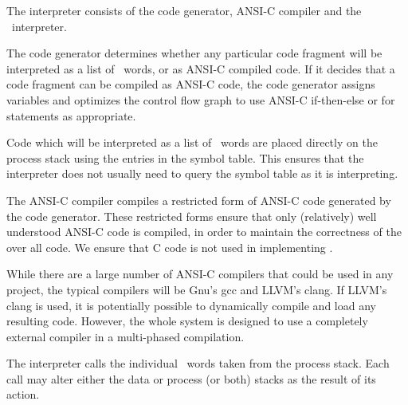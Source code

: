 \stopitemize

\item {}

The interpreter consists of the code generator, ANSI-C compiler and the 
\joylol\ interpreter.

\startitemize[2]

\item {}

The code generator determines whether any particular code fragment will be 
interpreted as a list of \joylol\ words, or as ANSI-C compiled code. If it 
decides that a code fragment can be compiled as ANSI-C code, the code 
generator assigns variables and optimizes the control flow graph to use 
ANSI-C if-then-else or for statements as appropriate. 

Code which will be interpreted as a list of \joylol\ words are placed 
directly on the process stack using the entries in the symbol table. This 
ensures that the interpreter does not usually need to query the symbol 
table as it is interpreting. 

\item {}

The ANSI-C compiler compiles a restricted form of ANSI-C code generated by 
the code generator. These restricted forms ensure that only (relatively) 
well understood ANSI-C code is compiled, in order to maintain the 
correctness of the over all code. We ensure that  C code is 
not used in implementing \joylol. 

While there are a large number of ANSI-C compilers that could be used in 
any project, the typical compilers will be Gnu's gcc and LLVM's clang. If 
LLVM's clang is used, it is potentially possible to dynamically compile 
and load any resulting code. However, the whole system is designed to use 
a completely external compiler in a multi-phased compilation. 

\item{}

The interpreter calls the individual \joylol\ words taken from the process 
stack. Each call may alter either the data or process (or both) stacks as 
the result of its action. 

\stopitemize

\stopitemize


